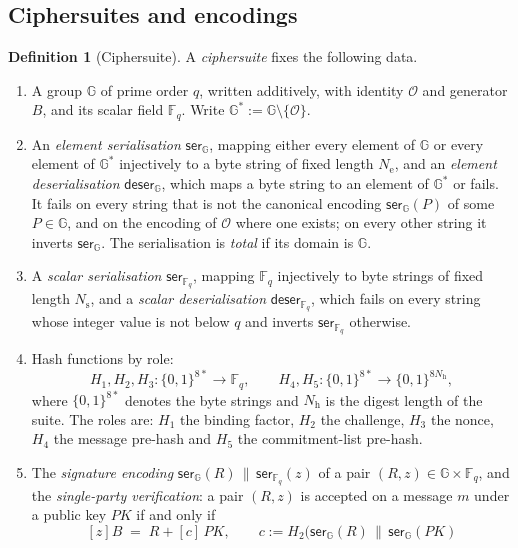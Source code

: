 \documentclass[11pt,a4paper]{article}
\theoremstyle{definition}
\newtheorem{definition}[theorem]{Definition}
\newcommand{\F}{\mathbb{F}}
\newcommand{\G}{\mathbb{G}}
\newcommand{\Fq}{\F_q}
\begin{document}
\subsection{Ciphersuites and encodings}\label{sec:sign-suite}

\begin{definition}[Ciphersuite]\label{def:suite}
A \emph{ciphersuite} fixes the following data.
\begin{enumerate}
\item[(a)] A group \(\G\) of prime order \(q\), written additively, with
  identity \(\mathcal{O}\) and generator \(B\), and its scalar field
  \(\Fq\). Write \(\G^{*} := \G \setminus \{\mathcal{O}\}\).
\item[(b)] An \emph{element serialisation} \(\mathsf{ser}_{\G}\), mapping
  either every element of \(\G\) or every element of \(\G^{*}\) injectively
  to a byte string of fixed length \(N_{\mathrm{e}}\), and an \emph{element
  deserialisation} \(\mathsf{deser}_{\G}\), which maps a byte string to an
  element of \(\G^{*}\) or fails. It fails on every string that is not the
  canonical encoding \(\mathsf{ser}_{\G}(P)\) of some \(P \in \G\), and on
  the encoding of \(\mathcal{O}\) where one exists; on every other string
  it inverts \(\mathsf{ser}_{\G}\). The serialisation is \emph{total} if its
  domain is \(\G\).
\item[(c)] A \emph{scalar serialisation} \(\mathsf{ser}_{\Fq}\), mapping
  \(\Fq\) injectively to byte strings of fixed length \(N_{\mathrm{s}}\),
  and a \emph{scalar deserialisation} \(\mathsf{deser}_{\Fq}\), which fails
  on every string whose integer value is not below \(q\) and inverts
  \(\mathsf{ser}_{\Fq}\) otherwise.
\item[(d)] Hash functions by role:
  \[
    H_1, H_2, H_3 \colon \{0,1\}^{8*} \to \Fq , \qquad
    H_4, H_5 \colon \{0,1\}^{8*} \to \{0,1\}^{8 N_{\mathrm{h}}} ,
  \]
  where \(\{0,1\}^{8*}\) denotes the byte strings and \(N_{\mathrm{h}}\) is
  the digest length of the suite. The roles are: \(H_1\) the binding
  factor, \(H_2\) the challenge, \(H_3\) the nonce, \(H_4\) the message
  pre-hash and \(H_5\) the commitment-list pre-hash.
\item[(e)] The \emph{signature encoding}
  \(\mathsf{ser}_{\G}(R) \,\|\, \mathsf{ser}_{\Fq}(z)\) of a pair
  \((R, z) \in \G \times \Fq\), and the \emph{single-party verification}:
  a pair \((R, z)\) is accepted on a message \(m\) under a public key
  \(\mathit{PK}\) if and only if
  \[
    [z]B \;=\; R + [c]\,\mathit{PK} , \qquad
    c := H_2\bigl(\mathsf{ser}_{\G}(R) \,\|\, \mathsf{ser}_{\G}(\mathit{PK})
\]
\end{enumerate}
\end{definition}
\end{document}
